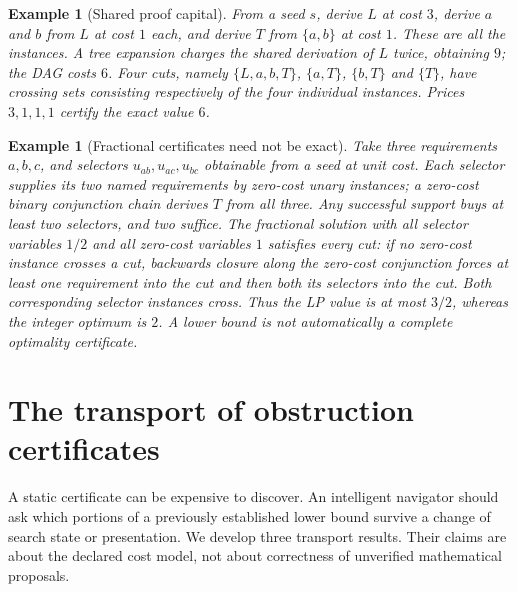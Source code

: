 \documentclass[11pt]{article}
\newtheorem{example}[theorem]{Example}
\theoremstyle{remark}\newtheorem{remark}[theorem]{Remark}
\begin{document}
\begin{example}[Shared proof capital]
From a seed $s$, derive $L$ at cost $3$, derive $a$ and $b$ from $L$ at cost $1$ each, and derive $T$ from $\{a,b\}$ at cost $1$. These are all the instances. A tree expansion charges the shared derivation of $L$ twice, obtaining $9$; the DAG costs $6$. Four cuts, namely $\{L,a,b,T\}$, $\{a,T\}$, $\{b,T\}$ and $\{T\}$, have crossing sets consisting respectively of the four individual instances. Prices $3,1,1,1$ certify the exact value $6$.
\end{example}
\begin{example}[Fractional certificates need not be exact]
Take three requirements $a,b,c$, and selectors $u_{ab},u_{ac},u_{bc}$ obtainable from a seed at unit cost. Each selector supplies its two named requirements by zero-cost unary instances; a zero-cost binary conjunction chain derives $T$ from all three. Any successful support buys at least two selectors, and two suffice. The fractional solution with all selector variables $1/2$ and all zero-cost variables $1$ satisfies every cut: if no zero-cost instance crosses a cut, backwards closure along the zero-cost conjunction forces at least one requirement into the cut and then both its selectors into the cut. Both corresponding selector instances cross. Thus the LP value is at most $3/2$, whereas the integer optimum is $2$. A lower bound is not automatically a complete optimality certificate.
\end{example}

\section{The transport of obstruction certificates}
A static certificate can be expensive to discover. An intelligent navigator should ask which portions of a previously established lower bound survive a change of search state or presentation. We develop three transport results. Their claims are about the declared cost model, not about correctness of unverified mathematical proposals.
\end{document}
